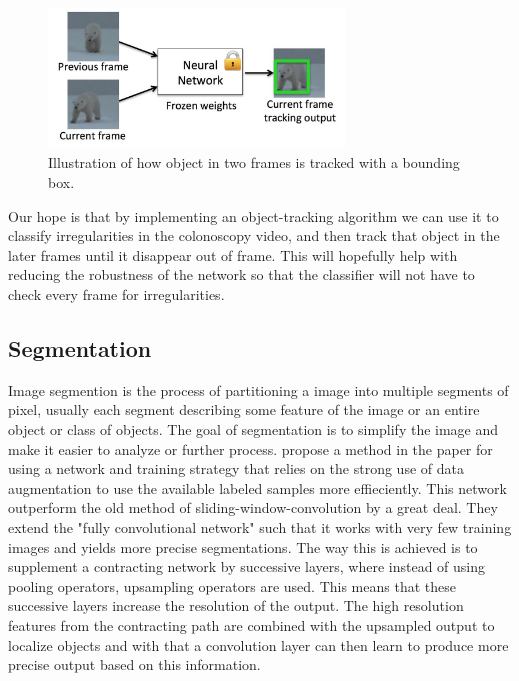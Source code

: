 \documentclass[english, a4paper]{article}
\begin{document}
\begin{figure}[H] %
  \begin{center}
    \includegraphics[width=0.7\textwidth]{object-tracking.jpg}
    \caption[Image]{Illustration of how object in two frames is tracked with a bounding box\footnotemark. }
    \label{fig:object-tracking}
  \end{center}
\end{figure}


Our hope is that by implementing an object-tracking algorithm we can use it to classify irregularities in the colonoscopy video, and then track that object in the later frames until it disappear out of frame. This will hopefully help with reducing the robustness of the network so that the classifier will not have to check every frame for irregularities. 



\subsection{Segmentation} \label{segmentation}
Image segmention is the process of partitioning a image into multiple segments of pixel, usually each segment describing some feature of the image or an entire object or class of objects. The goal of segmentation is to simplify the image and make it easier to analyze or further process. \citeauthor*{UNetConvolutional15} propose a method in the paper  \cite{UNetConvolutional15} for using a network and training strategy that relies on the strong use of data augmentation to use the available labeled samples more effieciently. This network outperform the old method of sliding-window-convolution by a great deal. They extend the "fully convolutional network" \cite{FullyConvolutional15} such that it works with very few training images and yields more precise segmentations. The way this is achieved is to supplement a contracting network by successive layers, where instead of using pooling operators, upsampling operators are used. This means that these successive layers increase the resolution of the output. The high resolution features from the contracting path are combined with the upsampled output to localize objects and with that a convolution layer can then learn to produce more precise output based on this information. 
\end{document}
